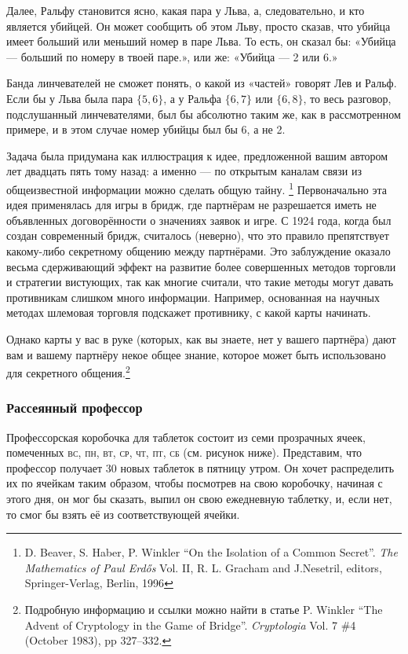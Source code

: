 Далее, Ральфу становится ясно, какая пара у Льва, а, следовательно, и кто является убийцей.
Он может сообщить об этом Льву, просто сказав, что убийца  имеет больший или меньший номер в паре Льва.
То есть, он сказал бы: «Убийца --- больший по номеру в твоей паре.», или же: «Убийца --- 2 или 6.»

Банда линчевателей не сможет понять, о какой из «частей» говорят Лев и Ральф.
Если бы у Льва была пара $\{5,6\}$, а у Ральфа $\{6,7\}$ или $\{6,8\}$, то весь разговор, подслушанный линчевателями, был бы абсолютно таким же, как в рассмотренном примере, и в этом случае номер убийцы был бы 6, а не 2.
\heart
 
Задача была придумана как иллюстрация к идее, предложенной вашим автором лет двадцать пять тому назад:
а именно --- по открытым каналам связи из общеизвестной информации можно сделать общую тайну.%
\footnote{D.
Beaver, S. Haber, P. Winkler ``On the Isolation of a Common Secret''. \emph{The Mathematics of Paul Erd\H{o}s} Vol. II, R. L. Gracham and J.Nesetril, editors, Springer-Verlag, Berlin, 1996}
Первоначально эта идея применялась для игры в бридж, где партнёрам не разрешается иметь не объявленных договорённости о значениях заявок и игре.
С 1924 года, когда был создан современный бридж, считалось (неверно), что это правило препятствует какому-либо секретному общению между партнёрами.
Это заблуждение оказало весьма сдерживающий эффект на развитие более совершенных методов торговли и стратегии вистующих, так как многие считали, что такие методы могут давать противникам слишком много информации.
Например, основанная на научных методах шлемовая торговля подскажет противнику, с какой карты начинать.

Однако карты у вас в руке (которых, как вы знаете, нет у вашего партнёра) дают вам и вашему партнёру некое общее знание, которое может быть использовано для секретного общения.\footnote{
Подробную информацию и ссылки можно найти в статье P. Winkler ``The Advent of Cryptology in the Game of Bridge''. \emph{Cryptologia} Vol. 7 \#4 (October 1983), pp 327--332.}

\subsubsection*{Рассеянный профессор}%

Профессорская коробочка для таблеток состоит из семи прозрачных ячеек, помеченных \textsc{вс}, \textsc{пн}, \textsc{вт}, \textsc{ср}, \textsc{чт}, \textsc{пт}, \textsc{сб} (см. рисунок ниже).
Представим, что профессор получает 30 новых таблеток в пятницу утром.
Он хочет распределить их по ячейкам таким образом, чтобы посмотрев на свою коробочку, начиная с этого дня, он мог бы сказать, выпил он свою ежедневную таблетку, и, если нет, то смог бы взять её из соответствующей ячейки.

